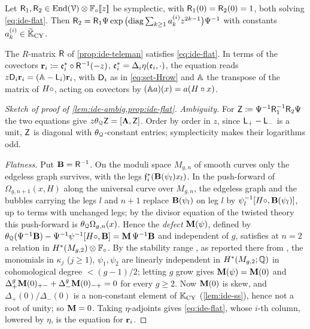\begin{lem}
\label{lem:ide-ambig}
Let $\mathsf{R}_1,\mathsf{R}_2\in\operatorname{End}(\mathcal{V})\otimes\mathbb{F}_{\circ}[\![ z ]\!]$ be symplectic, with $\mathsf{R}_1(0)=\mathsf{R}_2(0)=1$, both solving \eqref{eq:ide-flat}. Then $\mathsf{R}_2=\mathsf{R}_1\Psi\exp\big(\mathrm{diag}\sum_{k\geq1}a_k^{(i)}z^{2k-1}\big)\Psi^{-1}$ with constants $a_k^{(i)}\in\widetilde{\mathbb{K}}_{\mathrm{CY}}$.
\end{lem}

\begin{prop}
\label{prop:ide-flat}
The $R$-matrix $\mathsf{R}$ of \cref{prop:ide-teleman} satisfies \eqref{eq:ide-flat}. In terms of the covectors $\mathbf{r}_i\coloneqq\mathfrak{e}_i^*\circ\mathsf{R}^{-1}(-z)$, $\mathfrak{e}_i^*=\Delta_i\eta(\mathfrak{e}_i,\cdot)$, the equation reads $z\mathsf{D}_i\mathbf{r}_i=(\mathbb{A}-\mathsf{L}_i)\mathbf{r}_i$, with $\mathsf{D}_i$ as in \eqref{eq:set-Hrow} and $\mathbb{A}$ the transpose of the matrix of $H\circ$, acting on covectors by $(\mathbb{A} a)(x)=a(H\circ x)$.
\end{prop}

\begin{proof}[Sketch of proof of \cref{lem:ide-ambig,prop:ide-flat}]
\emph{Ambiguity.} For $\mathsf{Z}\coloneqq\Psi^{-1}\mathsf{R}_1^{-1}\mathsf{R}_2\Psi$ the two equations give $z\theta_{\mathcal{Q}}\mathsf{Z}=[\boldsymbol{\Lambda},\mathsf{Z}]$. Order by order in $z$, since $\mathsf{L}_+-\mathsf{L}_-$ is a unit, $\mathsf{Z}$ is diagonal with $\theta_{\mathcal{Q}}$-constant entries; symplecticity makes their logarithms odd.

\emph{Flatness.} Put $\mathbf{B}=\mathsf{R}^{-1}$. On the moduli space $M_{g,n}$ of smooth curves only the edgeless graph survives, with the legs $\mathfrak{f}_i^*(\mathbf{B}(\psi_l)x_l)$. In the push-forward of $\Omega_{g,n+1}(x,H)$ along the universal curve over $M_{g,n}$, the edgeless graph and the bubbles carrying the legs $l$ and $n+1$ replace $\mathbf{B}(\psi_l)$ on leg $l$ by $\psi_l^{-1}[H\circ,\mathbf{B}(\psi_l)]$, up to terms with unchanged legs; by the divisor equation of the twisted theory \cite[App.~1~(iv)]{CG07} this push-forward is $\theta_{\mathcal{Q}}\Omega_{g,n}(x)$. Hence the \emph{defect} $\mathbf{M}(\psi)$, defined by $\theta_{\mathcal{Q}}(\Psi^{-1}\mathbf{B})-\Psi^{-1}\psi^{-1}[H\circ,\mathbf{B}]=\mathbf{M}\,\Psi^{-1}\mathbf{B}$ and independent of $g$, satisfies at $n=2$ a relation in $H^*(M_{g,2})\otimes\mathbb{F}_{\circ}$. By the stability range \cite[2.17--2.19, (2.15)]{Tel12}, as reported there from \cite{Loo96,MW07,Har85,Iva90}, the monomials in $\kappa_j$ ($j\geq1$), $\psi_1,\psi_2$ are linearly independent in $H^*(M_{g,2};\mathbb{Q})$ in cohomological degree $<(g-1)/2$; letting $g$ grow gives $\mathbf{M}(\psi)=\mathbf{M}(0)$ and $\Delta_+^g\mathbf{M}(0)_{+-}+\Delta_-^g\mathbf{M}(0)_{-+}=0$ for every $g\geq2$. Now $\mathbf{M}(0)$ is skew, and $\Delta_+(0)/\Delta_-(0)$ is a non-constant element of $\mathbb{K}_{\mathrm{CY}}$ (\cref{lem:ide-ss}), hence not a root of unity; so $\mathbf{M}=0$. Taking $\eta$-adjoints gives \eqref{eq:ide-flat}, whose $i$-th column, lowered by $\eta$, is the equation for $\mathbf{r}_i$.
\end{proof}

